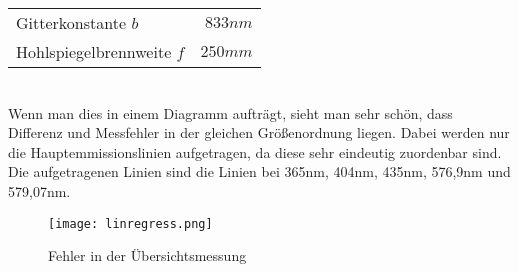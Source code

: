\newline
\begin{tabular}[h]{l r}
    Gitterkonstante $b$ & $833 nm$\\
    Hohlspiegelbrennweite $f$ & $250mm$\\
\end{tabular}
\\
\newline
Wenn man dies in einem Diagramm aufträgt, sieht man sehr schön, dass Differenz und Messfehler in der gleichen Größenordnung liegen. Dabei werden nur die Hauptemmissionslinien 
aufgetragen, da diese sehr eindeutig zuordenbar sind. Die aufgetragenen Linien sind die Linien bei 365nm, 404nm, 435nm, 576,9nm und 579,07nm.
\begin{figure}[h]
    \centering
    \texttt{[image: linregress.png]}
    \caption{Fehler in der Übersichtsmessung}
    \label{FehlUeb}
\end{figure}